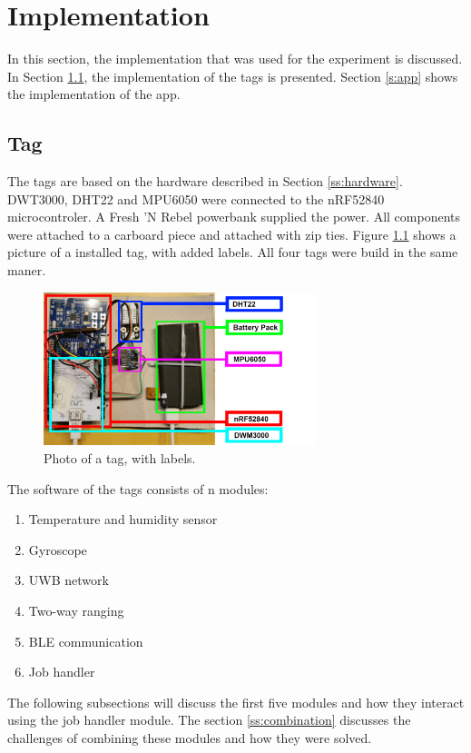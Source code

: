 \chapter{Implementation}
\label{c:implementation}

In this section, the implementation that was used for the experiment is discussed.
In Section \ref{s:tag}, the implementation of the tags is presented.
Section \ref{s:app} shows the implementation of the app.

\section{Tag}
\label{s:tag}

The tags are based on the hardware described in Section \ref{ss:hardware}.
DWT3000, DHT22 and MPU6050 were connected to the nRF52840 microcontroler.
A Fresh 'N Rebel powerbank supplied the power.
All components were attached to a carboard piece and attached with zip ties.
Figure \ref{f:tag_schematic} shows a picture of a installed tag, with added labels.
All four tags were build in the same maner.

\begin{figure}[ht!]
\centering
\includegraphics[width=300px]{graphics/schematics/tag_schematic.png}
\caption{ Photo of a tag, with labels.}
\label{f:tag_schematic}
\end{figure}

The software of the tags consists of n modules:
\begin{enumerate}
	\item Temperature and humidity sensor
	\item Gyroscope
	\item UWB network
	\item Two-way ranging
	\item BLE communication
	\item Job handler
\end{enumerate}

The following subsections will discuss the first five modules and how they interact using the job handler module.
The section \ref{ss:combination} discusses the challenges of combining these modules and how they were solved.

